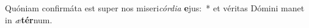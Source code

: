 \item Quóniam confirmáta est super nos miseri\textit{cór}\textit{di}\textit{a} \textbf{e}jus:~* et véritas Dómini manet in \textit{æ}\textbf{tér}num.
